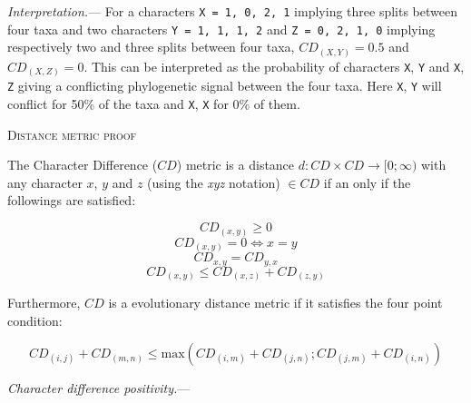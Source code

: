 \documentclass[12pt,letterpaper]{article}
\renewcommand{\section}[1]{%
\bigskip
\begin{center}
\begin{Large}
\normalfont\scshape #1
\medskip
\end{Large}
\end{center}}
\renewcommand{\subsection}[1]{%
\bigskip
\begin{center}
\begin{large}
\normalfont\itshape #1
\end{large}
\end{center}}
\renewcommand{\subsection}[1]{%
\vspace{2ex}
\noindent
\textit{#1.}---}
\begin{document}
\subsection{Interpretation}
For a characters \texttt{X = {1, 0, 2, 1}} implying three splits between four taxa and two characters \texttt{Y = {1, 1, 1, 2}} and \texttt{Z = {0, 2, 1, 0}} implying respectively two and three splits between four taxa, $CD_{(X,Y)} = 0.5$ and $CD_{(X,Z)} = 0$.
This can be interpreted as the probability of characters \texttt{X}, \texttt{Y} and \texttt{X}, \texttt{Z} giving a conflicting phylogenetic signal between the four taxa.
Here \texttt{X}, \texttt{Y} will conflict for 50\% of the taxa and \texttt{X}, \texttt{X} for 0\% of them.



\section{Distance metric proof}

The Character Difference ($CD$) metric is a distance $d: CD \times CD \rightarrow [0;\infty)$ with any character $x$, $y$ and $z$ (using the \textit{xyz} notation) $\in CD$ if an only if the followings are satisfied:

\begin{equation}
    \label{Positivity}
    CD_{(x,y)} \geq 0
\end{equation}
\begin{equation}
    \label{Identity}
    CD_{(x,y)} = 0 \Leftrightarrow x = y
\end{equation}
\begin{equation}
    \label{Equality}
    CD_{x,y} = CD_{y,x}
\end{equation}
\begin{equation}
    \label{Subadditivity}
    CD_{(x,y)} \leq CD_{(x,z)} + CD_{(z,y)}
\end{equation}

\noindent Furthermore, $CD$ is a evolutionary distance metric if it satisfies the four point condition:

\begin{equation}
    \label{fourpoint}
    CD_{(i,j)} + CD_{(m,n)} \leq \text{max}{(CD_{(i,m)} + CD_{(j,n)} ; CD_{(j,m)} + CD_{(i,n)} )}
\end{equation}

\newpage

\subsection{Character difference positivity}
\end{document}
